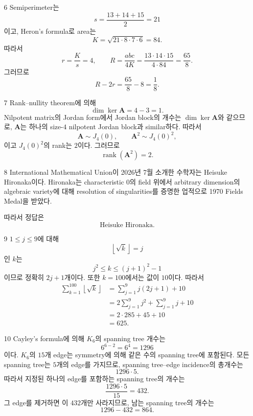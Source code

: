 \documentclass[11pt,oneside]{article}
\begin{document}
\begin{problemsolution}{6}
Semiperimeter는
\[
    s=\frac{13+14+15}{2}=21
\]
이고, Heron's formula로 area는
\[
    K
    =
    \sqrt{21\cdot8\cdot7\cdot6}
    =84.
\]
따라서
\[
    r=\frac{K}{s}=4,
    \qquad
    R=\frac{abc}{4K}
    =\frac{13\cdot14\cdot15}{4\cdot84}
    =\frac{65}{8}.
\]
그러므로
\[
    R-2r
    =
    \frac{65}{8}-8
    =
    \boxed{\frac18}.
\]
\end{problemsolution}

\newpage

\begin{problemsolution}{7}
Rank--nullity theorem에 의해
\[
    \dim\ker\mathbf{A}=4-3=1.
\]
Nilpotent matrix의 Jordan form에서 Jordan block의 개수는 $\dim\ker\mathbf{A}$와 같으므로, $\mathbf{A}$는 하나의 size-$4$ nilpotent Jordan block과 similar하다. 따라서
\[
    \mathbf{A}\sim J_4(0),
    \qquad
    \mathbf{A}^2\sim J_4(0)^2,
\]
이고 $J_4(0)^2$의 rank는 $2$이다. 그러므로
\[
    \boxed{\operatorname{rank}(\mathbf{A}^2)=2}.
\]
\end{problemsolution}

\begin{problemsolution}{8}
International Mathematical Union이 2026년 7월 소개한 수학자는 Heisuke Hironaka이다. Hironaka는 characteristic $0$의 field 위에서 arbitrary dimension의 algebraic variety에 대해 resolution of singularities를 증명한 업적으로 1970 Fields Medal을 받았다.

따라서 정답은
\[
    \boxed{\text{Heisuke Hironaka}}.
\]
\end{problemsolution}

\begin{problemsolution}{9}
$1\leq j\leq9$에 대해
\[
    \left\lfloor\sqrt{k}\right\rfloor=j
\]
인 $k$는
\[
    j^2\leq k\leq(j+1)^2-1
\]
이므로 정확히 $2j+1$개이다. 또한 $k=100$에서는 값이 $10$이다. 따라서
\[
    \begin{aligned}
    \sum_{k=1}^{100}\left\lfloor\sqrt{k}\right\rfloor
    &=
    \sum_{j=1}^{9}j(2j+1)+10\\
    &=
    2\sum_{j=1}^{9}j^2+\sum_{j=1}^{9}j+10\\
    &=
    2\cdot285+45+10\\
    &=\boxed{625}.
    \end{aligned}
\]
\end{problemsolution}

\begin{problemsolution}{10}
Cayley's formula에 의해 $K_6$의 spanning tree 개수는
\[
    6^{6-2}=6^4=1296
\]
이다. $K_6$의 $15$개 edge는 symmetry에 의해 같은 수의 spanning tree에 포함된다. 모든 spanning tree는 $5$개의 edge를 가지므로, spanning tree--edge incidence의 총개수는
\[
    1296\cdot5.
\]
따라서 지정된 하나의 edge를 포함하는 spanning tree의 개수는
\[
    \frac{1296\cdot5}{15}=432.
\]
그 edge를 제거하면 이 $432$개만 사라지므로, 남는 spanning tree의 개수는
\[
    1296-432
    =
    \boxed{864}.
\]
\end{problemsolution}
\end{document}

